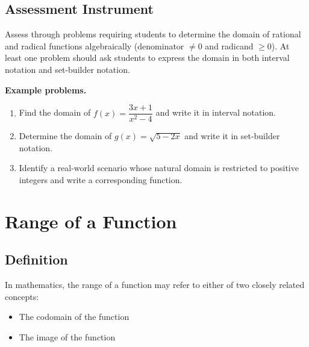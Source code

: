 \subsection{Assessment Instrument}
\label{ssec:asse-a1fc}

Assess through problems requiring students to determine the domain of rational and radical
functions algebraically (denominator $\neq 0$ and radicand $\geq 0$). At least one problem
should ask students to express the domain in both interval notation and set-builder
notation.

\textbf{Example problems.}

\begin{enumerate}
    \item Find the domain of $f(x) = \dfrac{3x + 1}{x^2 - 4}$ and write it in interval notation.
    \item Determine the domain of $g(x) = \sqrt{5 - 2x}$ and write it in set-builder notation.
    \item Identify a real-world scenario whose natural domain is restricted to positive integers and write a corresponding function.
\end{enumerate}

\section{Range of a Function}
\label{sec:rang-baf4}
\subsection{Definition}
\label{sss:defi-3061}

In mathematics, the range of a function may refer to either of two closely related
concepts:

\begin{itemize}
    \item The codomain of the function
    \item The image of the function
\end{itemize}

